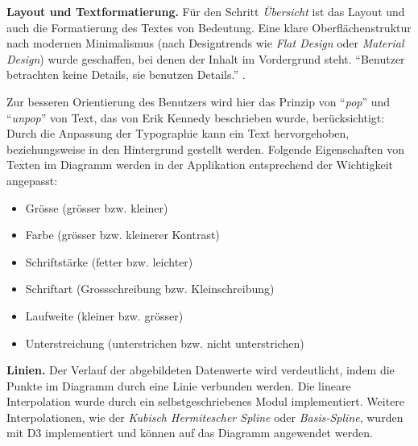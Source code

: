 \textbf{Layout und Textformatierung.} Für den Schritt \textit{Übersicht} ist das Layout und auch die Formatierung des Textes von Bedeutung. Eine klare Oberflächenstruktur nach modernen Minimalismus (nach Designtrends wie \textit{Flat Design} oder \textit{Material Design}) wurde geschaffen, bei denen der Inhalt im Vordergrund steht. "`Benutzer betrachten keine Details, sie benutzen Details."' \cite{minimalism}.

Zur besseren Orientierung des Benutzers wird hier das Prinzip von "`\textit{pop}"' und "`\textit{unpop}"' von Text, das von Erik Kennedy \cite{pop} beschrieben wurde, berücksichtigt: Durch die Anpassung der Typographie kann ein Text hervorgehoben, beziehungsweise in den Hintergrund gestellt werden. Folgende Eigenschaften von Texten im Diagramm werden in der Applikation entsprechend der Wichtigkeit angepasst:

\begin{itemize}
	\item Grösse (grösser bzw. kleiner)
	\item Farbe (grösser bzw. kleinerer Kontrast)
	\item Schriftstärke (fetter bzw. leichter)
	\item Schriftart (Grossschreibung bzw. Kleinschreibung)
	\item Laufweite (kleiner bzw. grösser)
	\item Unterstreichung (unterstrichen bzw. nicht unterstrichen)
\end{itemize}

\textbf{Linien.} Der Verlauf der abgebildeten Datenwerte wird verdeutlicht, indem die Punkte im Diagramm durch eine Linie verbunden werden. Die lineare Interpolation wurde durch ein selbstgeschriebenes Modul implementiert. Weitere Interpolationen, wie der \textit{Kubisch Hermitescher Spline} oder \textit{Basis-Spline}, wurden mit D3 implementiert und können auf das Diagramm angewendet werden.

